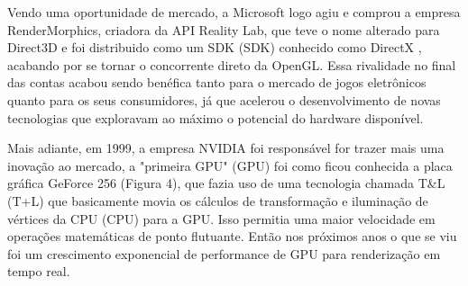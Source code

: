 Vendo uma oportunidade de mercado, a Microsoft logo agiu e comprou a empresa RenderMorphics, criadora da \acrshort{API} Reality Lab, que teve o nome alterado para Direct3D e foi distribuido como um SDK (\acrlong{SDK}) conhecido como DirectX \cite{openGLBook}, acabando por se tornar o concorrente direto da \acrshort{OpenGL}. Essa rivalidade no final das contas acabou sendo benéfica tanto para o mercado de jogos eletrônicos quanto para os seus consumidores, já que acelerou o desenvolvimento de novas tecnologias que exploravam ao máximo o potencial do hardware disponível.
	
Mais adiante, em 1999, a empresa NVIDIA foi responsável for trazer mais uma inovação ao mercado, a "primeira GPU" (\acrlong{GPU}) foi como ficou conhecida a placa gráfica GeForce 256 (Figura 4), que fazia uso de uma tecnologia chamada T\&L (\acrlong{T+L}) que basicamente movia os cálculos de transformação e iluminação de vértices da CPU (\acrlong{CPU}) para a \acrshort{GPU}. Isso permitia uma maior velocidade em operações matemáticas de ponto flutuante. Então nos próximos anos o que se viu foi um crescimento exponencial de performance de \acrshort{GPU} para renderização em tempo real.

